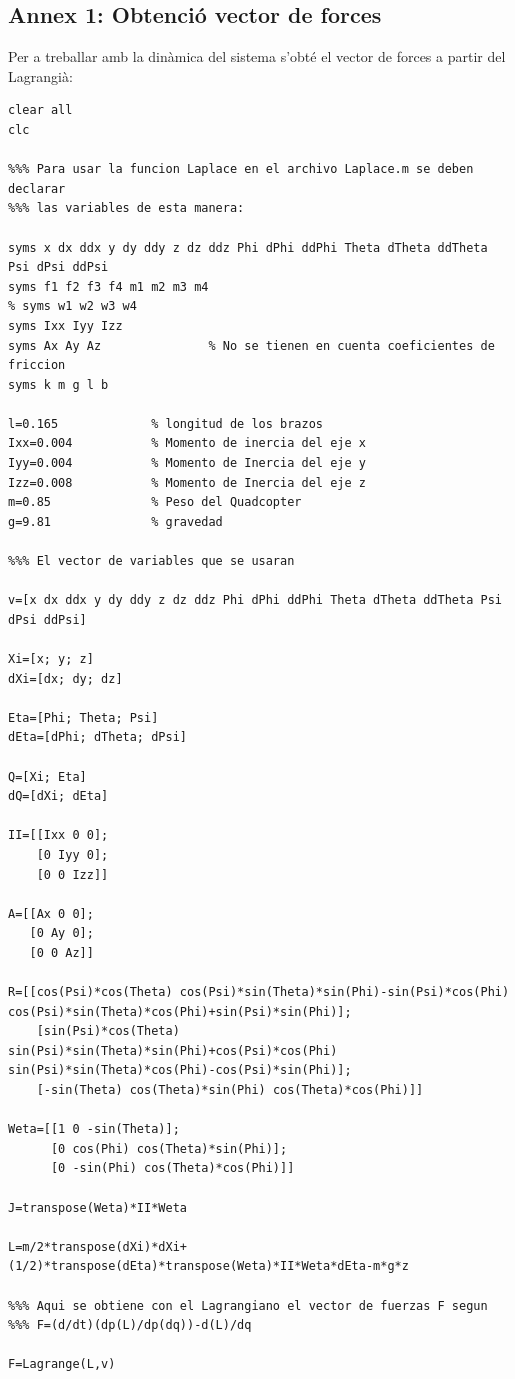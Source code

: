 \documentclass[twoside]{article}
\begin{document}
\subsection*{Annex 1: Obtenció vector de forces}
Per a treballar amb la dinàmica del sistema s'obté el vector de forces a partir del Lagrangià:
\begin{verbatim}
clear all
clc

%%% Para usar la funcion Laplace en el archivo Laplace.m se deben declarar
%%% las variables de esta manera:

syms x dx ddx y dy ddy z dz ddz Phi dPhi ddPhi Theta dTheta ddTheta Psi dPsi ddPsi
syms f1 f2 f3 f4 m1 m2 m3 m4
% syms w1 w2 w3 w4
syms Ixx Iyy Izz
syms Ax Ay Az               % No se tienen en cuenta coeficientes de friccion
syms k m g l b

l=0.165             % longitud de los brazos
Ixx=0.004           % Momento de inercia del eje x 
Iyy=0.004           % Momento de Inercia del eje y
Izz=0.008           % Momento de Inercia del eje z
m=0.85              % Peso del Quadcopter
g=9.81              % gravedad 

%%% El vector de variables que se usaran

v=[x dx ddx y dy ddy z dz ddz Phi dPhi ddPhi Theta dTheta ddTheta Psi dPsi ddPsi]

Xi=[x; y; z]
dXi=[dx; dy; dz]

Eta=[Phi; Theta; Psi]
dEta=[dPhi; dTheta; dPsi]

Q=[Xi; Eta]
dQ=[dXi; dEta]

II=[[Ixx 0 0];
    [0 Iyy 0];
    [0 0 Izz]]

A=[[Ax 0 0];
   [0 Ay 0];
   [0 0 Az]]   
   
R=[[cos(Psi)*cos(Theta) cos(Psi)*sin(Theta)*sin(Phi)-sin(Psi)*cos(Phi) cos(Psi)*sin(Theta)*cos(Phi)+sin(Psi)*sin(Phi)];
    [sin(Psi)*cos(Theta) sin(Psi)*sin(Theta)*sin(Phi)+cos(Psi)*cos(Phi) sin(Psi)*sin(Theta)*cos(Phi)-cos(Psi)*sin(Phi)];
    [-sin(Theta) cos(Theta)*sin(Phi) cos(Theta)*cos(Phi)]]

Weta=[[1 0 -sin(Theta)];
      [0 cos(Phi) cos(Theta)*sin(Phi)];
      [0 -sin(Phi) cos(Theta)*cos(Phi)]]
  
J=transpose(Weta)*II*Weta  
  
L=m/2*transpose(dXi)*dXi+(1/2)*transpose(dEta)*transpose(Weta)*II*Weta*dEta-m*g*z

%%% Aqui se obtiene con el Lagrangiano el vector de fuerzas F segun
%%% F=(d/dt)(dp(L)/dp(dq))-d(L)/dq

F=Lagrange(L,v)


\end{verbatim}
\end{document}
